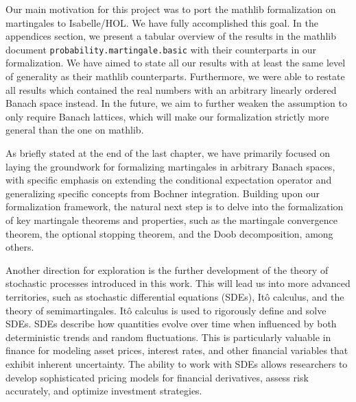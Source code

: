 Our main motivation for this project was to port the \textsf{mathlib} formalization on martingales to Isabelle/HOL. We have fully accomplished this goal. In the appendices section, we present a tabular overview of the results in the \textsf{mathlib} document \texttt{probability.mar\-tingale.basic} with their counterparts in our formalization. We have aimed to state all our results with at least the same level of generality as their \textsf{mathlib} counterparts. Furthermore, we were able to restate all results which contained the real numbers with an arbitrary linearly ordered Banach space instead. In the future, we aim to further weaken the assumption to only require Banach lattices, which will make our formalization strictly more general than the one on \textsf{mathlib}.

As briefly stated at the end of the last chapter, we have primarily focused on laying the groundwork for formalizing martingales in arbitrary Banach spaces, with specific emphasis on extending the conditional expectation operator and generalizing specific concepts from Bochner integration. Building upon our formalization framework, the natural next step is to delve into the formalization of key martingale theorems and properties, such as the martingale convergence theorem, the optional stopping theorem, and the Doob decomposition, among others. 

Another direction for exploration is the further development of the theory of stochastic processes introduced in this work. This will lead us into more advanced territories, such as stochastic differential equations (SDEs), It\^o calculus, and the theory of semimartingales. It\^o calculus is used to rigorously define and solve SDEs. SDEs describe how quantities evolve over time when influenced by both deterministic trends and random fluctuations. This is particularly valuable in finance for modeling asset prices, interest rates, and other financial variables that exhibit inherent uncertainty. The ability to work with SDEs allows researchers to develop sophisticated pricing models for financial derivatives, assess risk accurately, and optimize investment strategies.

